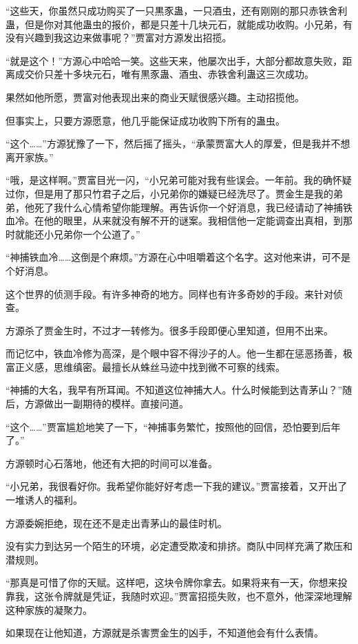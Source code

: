\begin{this_body}
“这些天，你虽然只成功购买了一只黒豕蛊，一只酒虫，还有刚刚的那只赤铁舍利蛊，但是你对其他蛊虫的报价，都是只差十几块元石，就能成功收购。小兄弟，有没有兴趣到我这边来做事呢？”贾富对方源发出招揽。

“就是这个！”方源心中哈哈一笑。这些天来，他屡次出手，大部分都故意失败，距离成交价只差十多块元石，唯有黒豕蛊、酒虫、赤铁舍利蛊这三次成功。

果然如他所愿，贾富对他表现出来的商业天赋很感兴趣。主动招揽他。

但事实上，只要方源愿意，他几乎能保证成功收购下所有的蛊虫。

“这个……”方源犹豫了一下，然后摇了摇头，“承蒙贾富大人的厚爱，但是我并不想离开家族。”

“哦，是这样啊。”贾富目光一闪，“小兄弟可能对我有些误会。一年前。我的确怀疑过你，但是用了那只竹君子之后，小兄弟你的嫌疑已经洗尽了。贾金生是我的弟弟，他死了我什么心情希望你能理解。再告诉你一个好消息，我已经请动了神捕铁血冷。在他的眼里，从来就没有解不开的谜案。我相信他一定能调查出真相，到那时就能还小兄弟你一个公道了。”

“神捕铁血冷……这倒是个麻烦。”方源在心中咀嚼着这个名字。这对他来讲，可不是个好消息。

这个世界的侦测手段。有许多神奇的地方。同样也有许多奇妙的手段。来针对侦查。

方源杀了贾金生时，不过才一转修为。很多手段即便心里知道，但用不出来。

而记忆中，铁血冷修为高深，是个眼中容不得沙子的人。他一生都在惩恶扬善，极富正义感，思维缜密。最擅长从蛛丝马迹中找到微不可察的线索。

“神捕的大名，我早有所耳闻。不知道这位神捕大人。什么时候能到达青茅山？”随后，方源做出一副期待的模样。直接问道。

“这个……”贾富尴尬地笑了一下，“神捕事务繁忙，按照他的回信，恐怕要到后年了。”

方源顿时心石落地，他还有大把的时间可以准备。

“小兄弟，我很看好你。我希望你能好好考虑一下我的建议。”贾富接着，又开出了一堆诱人的福利。

方源委婉拒绝，现在还不是走出青茅山的最佳时机。

没有实力到达另一个陌生的环境，必定遭受欺凌和排挤。商队中同样充满了欺压和潜规则。

“那真是可惜了你的天赋。这样吧，这块令牌你拿去。如果将来有一天，你想来投靠我，这张令牌就是凭证，我随时欢迎。”贾富招揽失败，也不意外，他深深地理解这种家族的凝聚力。

如果现在让他知道，方源就是杀害贾金生的凶手，不知道他会有什么表情。


\end{this_body}
